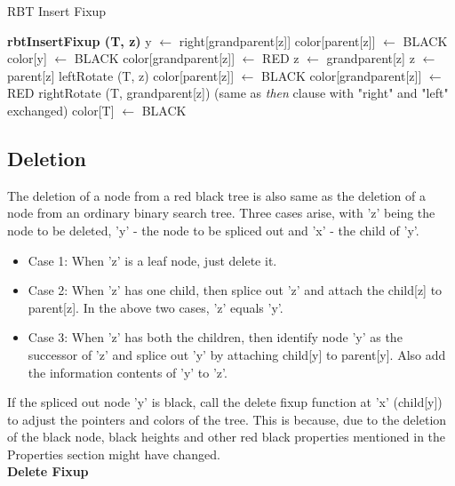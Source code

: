 \documentclass[11pt, oneside, a4paper]{article}
\begin{document}
\begin{algorithm}
\caption {RBT Insert Fixup}
\label {alg2}
\begin{algorithmic}[1]
\STATE \textbf {rbtInsertFixup (T, z)}
\STATE y $\leftarrow$ right[grandparent[z]]
\STATE color[parent[z]] $\leftarrow$ BLACK
\STATE color[y] $\leftarrow$ BLACK
\STATE color[grandparent[z]] $\leftarrow$ RED
\STATE z $\leftarrow$ grandparent[z]
\ELSE
{}
\STATE z $\leftarrow$ parent[z]
\STATE leftRotate (T, z)
\ENDIF
\STATE color[parent[z]] $\leftarrow$ BLACK
\STATE color[grandparent[z]] $\leftarrow$ RED
\STATE rightRotate (T, grandparent[z])
\ENDIF
\ELSE
\STATE (same as \emph {then} clause with "right" and "left" exchanged)
\ENDIF
\ENDWHILE
\STATE color[T] $\leftarrow$ BLACK
\end{algorithmic}
\end{algorithm}

\subsection{Deletion}
The deletion of a node from a red black tree is also same as the deletion of a node from an ordinary binary search tree.  Three cases arise, with 'z' being the node to be deleted, 'y' - the node to be spliced out and 'x' - the child of 'y'.
\begin{itemize}
\item Case 1: When 'z' is a leaf node, just delete it.
\item Case 2: When 'z' has one child, then splice out 'z' and attach the child[z] to parent[z].  In the above two cases, 'z' equals 'y'.
\item Case 3: When 'z' has both the children, then identify node 'y' as the successor of 'z' and splice out 'y' by attaching child[y] to parent[y].  Also add the information contents of 'y' to 'z'.
\end{itemize}
If the spliced out node 'y' is black, call the delete fixup function at 'x' (child[y]) to adjust the pointers and colors of the tree. This is because, due to the deletion of the black node, black heights and other red black properties mentioned in the Properties section might have changed.\\

\textbf {Delete Fixup}\\
\end{document}

